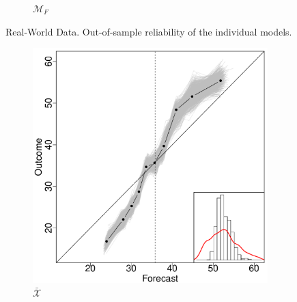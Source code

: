 \documentclass[12pt]{article}
\theoremstyle{definition}
\theoremstyle{definition}
\begin{document}
\begin{figure}[t]
\begin{subfigure}[b]{0.241\textwidth}
                \caption{$\mathcal{M}_F$}
                \label{RelDiagramNoF}
        \end{subfigure}           
          \caption{Real-World Data. Out-of-sample reliability of the individual models.}
                \label{RelDiagramMo}
\end{figure}
\begin{figure}[t]
        \centering
 
        \begin{subfigure}[b]{0.323\textwidth}
                \includegraphics[width=\textwidth]{IndependentELP.pdf}
                \caption{$\bar{\mathcal{X}}$}
                \label{fig:mouse}
        \end{subfigure}
                  \begin{subfigure}[b]{0.323\textwidth}

\end{subfigure}
\end{figure}
\end{document}
